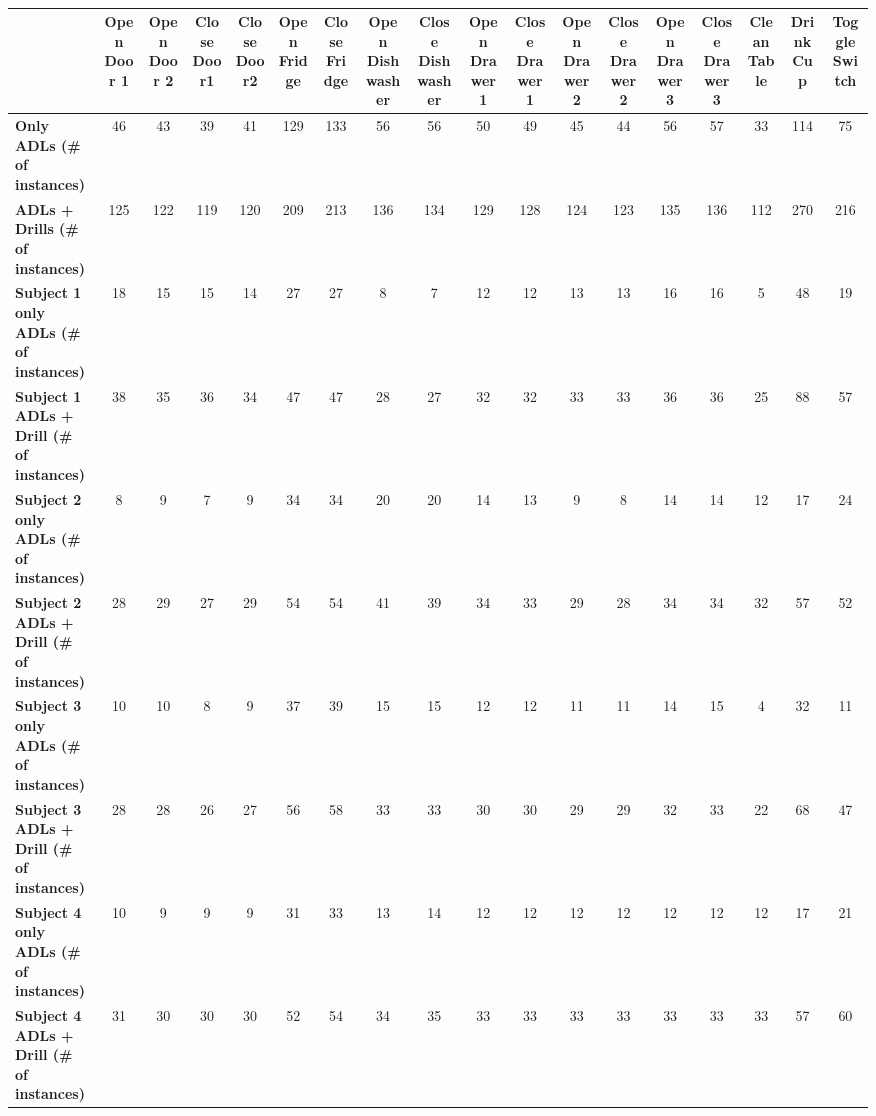 \begin{table}
\centering
\begin{tabular}{|l|c|c|c|c|c|c|c|c|c|c|c|c|c|c|c|c|c|}
\hline
&\textbf{Open Door 1}&\textbf{Open Door 2}&\textbf{Close Door1}&\textbf{Close Door2}&\textbf{Open Fridge}&\textbf{Close Fridge}&\textbf{Open Dishwasher}&\textbf{Close Dishwasher}&\textbf{Open Drawer1}&\textbf{Close Drawer1}&\textbf{Open Drawer2}&\textbf{Close Drawer2}&\textbf{Open Drawer3}&\textbf{Close Drawer3}&\textbf{Clean Table}&\textbf{Drink Cup}&\textbf{Toggle Switch}\\\hline
\textbf{Only ADLs (# of instances)}&46&43&39&41&129&133&56&56&50&49&45&44&56&57&33&114&75\\\hline
\textbf{ADLs + Drills (# of instances)}&125&122&119&120&209&213&136&134&129&128&124&123&135&136&112&270&216\\\hline
\textbf{Subject 1 only ADLs (# of instances)}&18&15&15&14&27&27&8&7&12&12&13&13&16&16&5&48&19\\\hline
\textbf{Subject 1 ADLs + Drill (# of instances)}&38&35&36&34&47&47&28&27&32&32&33&33&36&36&25&88&57\\\hline
\textbf{Subject 2 only ADLs (# of instances)}&8&9&7&9&34&34&20&20&14&13&9&8&14&14&12&17&24\\\hline
\textbf{Subject 2 ADLs + Drill (# of instances)}&28&29&27&29&54&54&41&39&34&33&29&28&34&34&32&57&52\\\hline
\textbf{Subject 3 only ADLs (# of instances)}&10&10&8&9&37&39&15&15&12&12&11&11&14&15&4&32&11\\\hline
\textbf{Subject 3 ADLs + Drill (# of instances)}&28&28&26&27&56&58&33&33&30&30&29&29&32&33&22&68&47\\\hline
\textbf{Subject 4 only ADLs (# of instances)}&10&9&9&9&31&33&13&14&12&12&12&12&12&12&12&17&21\\\hline
\textbf{Subject 4 ADLs + Drill (# of instances)}&31&30&30&30&52&54&34&35&33&33&33&33&33&33&33&57&60\\\hline
\end{tabular}
\caption{}
\end{table}
